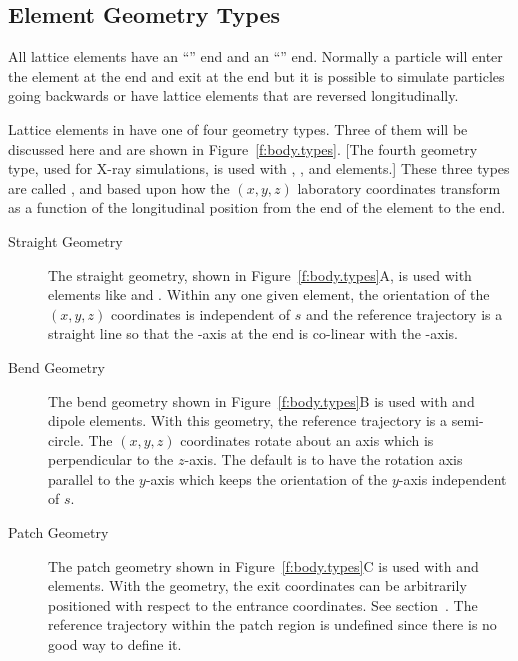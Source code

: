 \documentclass{hitec}     %
\begin{document}
{%
\subsection{Element Geometry Types}

All lattice elements have an ``'' end and an ``'' end. Normally a particle
will enter the element at the  end and exit at the  end but it is possible to
simulate particles going backwards or have lattice elements that are reversed longitudinally.

Lattice elements in \bmad have one of four geometry types. Three of them will be discussed here and
are shown in Figure~\ref{f:body.types}. [The fourth geometry type, used for X-ray simulations, is
used with , , and  elements.] These three types are
called ,  and  based upon how the $(x, y, z)$ laboratory coordinates
transform as a function of the longitudinal  position from the  end of the
element to the  end.
\begin{description}
\item[Straight Geometry] \Newline
The straight geometry, shown in Figure~\ref{f:body.types}A, is used with elements like  and
. Within any one given element, the orientation of the $(x, y, z)$ coordinates is independent of $s$ and the
reference trajectory is a straight line so that the -axis at the  end is co-linear
with the  -axis.
\item[Bend Geometry] \Newline
The bend geometry shown in Figure~\ref{f:body.types}B is used with  and  dipole
elements. With this geometry, the reference trajectory is a semi-circle. The $(x, y, z)$ coordinates
rotate about an axis which is perpendicular to the $z$-axis. The default is to have the rotation
axis parallel to the $y$-axis which keeps the orientation of the $y$-axis independent of $s$.
\item[Patch Geometry] \Newline 
The patch geometry shown in Figure~\ref{f:body.types}C is used with  and 
elements. With the  geometry, the exit coordinates can be arbitrarily positioned with
respect to the entrance coordinates. See section~. The reference trajectory within the patch
region is undefined since there is no good way to define it.
\end{description}

}
\end{document}
